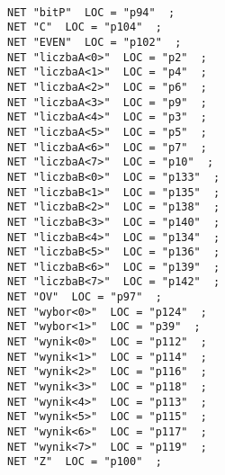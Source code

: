 \begin{lstlisting}

NET "bitP"  LOC = "p94"  ;
NET "C"  LOC = "p104"  ;
NET "EVEN"  LOC = "p102"  ;
NET "liczbaA<0>"  LOC = "p2"  ;
NET "liczbaA<1>"  LOC = "p4"  ;
NET "liczbaA<2>"  LOC = "p6"  ;
NET "liczbaA<3>"  LOC = "p9"  ;
NET "liczbaA<4>"  LOC = "p3"  ;
NET "liczbaA<5>"  LOC = "p5"  ;
NET "liczbaA<6>"  LOC = "p7"  ;
NET "liczbaA<7>"  LOC = "p10"  ;
NET "liczbaB<0>"  LOC = "p133"  ;
NET "liczbaB<1>"  LOC = "p135"  ;
NET "liczbaB<2>"  LOC = "p138"  ;
NET "liczbaB<3>"  LOC = "p140"  ;
NET "liczbaB<4>"  LOC = "p134"  ;
NET "liczbaB<5>"  LOC = "p136"  ;
NET "liczbaB<6>"  LOC = "p139"  ;
NET "liczbaB<7>"  LOC = "p142"  ;
NET "OV"  LOC = "p97"  ;
NET "wybor<0>"  LOC = "p124"  ;
NET "wybor<1>"  LOC = "p39"  ;
NET "wynik<0>"  LOC = "p112"  ;
NET "wynik<1>"  LOC = "p114"  ;
NET "wynik<2>"  LOC = "p116"  ;
NET "wynik<3>"  LOC = "p118"  ;
NET "wynik<4>"  LOC = "p113"  ;
NET "wynik<5>"  LOC = "p115"  ;
NET "wynik<6>"  LOC = "p117"  ;
NET "wynik<7>"  LOC = "p119"  ;
NET "Z"  LOC = "p100"  ;

\end{lstlisting}